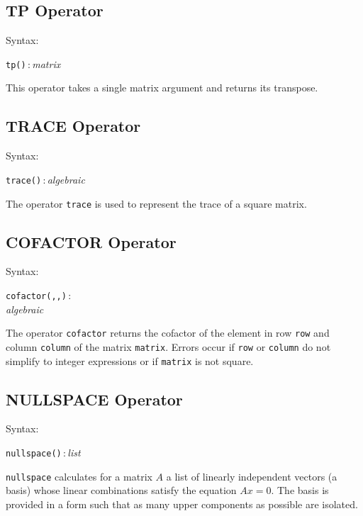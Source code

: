 \subsection{TP Operator}
\hypertarget{operator:TP}{}
Syntax:
\begin{syntax}
  \texttt{tp(}\texttt{)}\,:\,\textit{matrix}
\end{syntax}

This operator takes a single matrix argument and returns its transpose.

\subsection{TRACE Operator}
\hypertarget{operator:TRACE}{}
Syntax:
\begin{syntax}
  \texttt{trace(}\texttt{)}\,:\,\textit{algebraic}
\end{syntax}
The operator \texttt{trace} is used to represent the trace of a square matrix.

\subsection{COFACTOR Operator}
\hypertarget{operator:COFACTOR}{}
Syntax:
\begin{syntax}
  \texttt{cofactor(}\texttt{,}\texttt{,}\texttt{)}\,:\\
  \textit{algebraic}
\end{syntax}

The operator \texttt{cofactor} returns the cofactor of the element in row
\texttt{row} and column \texttt{column} of the matrix \texttt{matrix}.  Errors occur
if \texttt{row} or \texttt{column} do not simplify to integer expressions or if
\texttt{matrix} is not square.

\subsection{NULLSPACE Operator}
\hypertarget{operator:NULLSPACE}{}
Syntax:
\begin{syntax}
  \texttt{nullspace(}\texttt{)}\,:\,\textit{list}
\end{syntax}
\texttt{nullspace} calculates for a matrix $A$ a list of linearly
independent vectors (a basis) whose linear combinations satisfy the
equation $A x = 0$.  The basis is provided in a form such that as many
upper components as possible are isolated.

